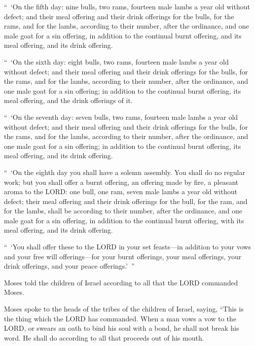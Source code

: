 \myverse{}“ ‘On the fifth day: nine bulls, two rams, fourteen male lambs
a year old without defect;
\myverse{}and their meal offering and their drink offerings for the bulls, for the
rams, and for the lambs, according to their number, after the ordinance,
\myverse{}and one male goat for a sin offering, in addition to the continual burnt
offering, and its meal offering, and its drink offering.


\myverse{}“ ‘On the sixth day: eight bulls, two rams, fourteen male lambs
a year old without defect;
\myverse{}and their meal offering and their drink offerings for the bulls, for the
rams, and for the lambs, according to their number, after the ordinance,
\myverse{}and one male goat for a sin offering; in addition to the continual burnt
offering, its meal offering, and the drink offerings of it.


\myverse{}“ ‘On the seventh day: seven bulls, two rams, fourteen male lambs
a year old without defect;
\myverse{}and their meal offering and their drink offerings for the bulls, for the
rams, and for the lambs, according to their number, after the ordinance,
\myverse{}and one male goat for a sin offering; in addition to the continual burnt
offering, its meal offering, and its drink offering.


\myverse{}“ ‘On the eighth day you shall have a solemn assembly. You shall
do no regular work;
\myverse{}but you shall offer a burnt offering, an offering made by fire, a pleasant
aroma to the LORD: one bull, one ram, seven male lambs a year old without defect;
\myverse{}their meal offering and their drink offerings for the bull, for the ram,
and for the lambs, shall be according to their number, after the ordinance,
\myverse{}and one male goat for a sin offering, in addition to the continual burnt
offering, with its meal offering, and its drink offering.


\myverse{}“ ‘You shall offer these to the LORD in your set feasts—in addition
to your vows and your free will offerings—for your burnt offerings, your meal offerings, your drink offerings,
and your peace offerings.’ ”


\myverse{}Moses told the children of Israel according to all that the
LORD commanded Moses.


\mychapter{} \myverse*{}Moses spoke to the heads of the tribes of the children of Israel,
saying, “This is the thing which the LORD has commanded.
\myverse{}When a man vows a vow to the LORD, or swears an oath to bind his soul with
a bond, he shall not break his word. He shall do according to all that proceeds out of his mouth.


